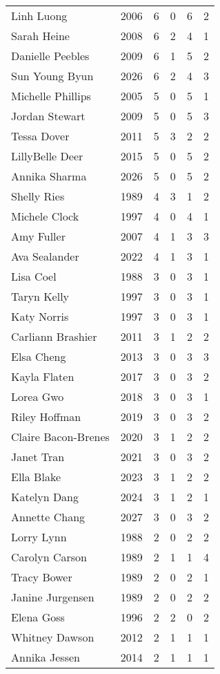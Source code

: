 \begin{longtable}{lccccc}
Linh Luong & 2006 & 6 & 0 & 6 & 2 \\
Sarah Heine & 2008 & 6 & 2 & 4 & 1 \\
Danielle Peebles & 2009 & 6 & 1 & 5 & 2 \\
Sun Young Byun & 2026 & 6 & 2 & 4 & 3 \\
Michelle Phillips & 2005 & 5 & 0 & 5 & 1 \\
Jordan Stewart & 2009 & 5 & 0 & 5 & 3 \\
Tessa Dover & 2011 & 5 & 3 & 2 & 2 \\
LillyBelle Deer & 2015 & 5 & 0 & 5 & 2 \\
Annika Sharma & 2026 & 5 & 0 & 5 & 2 \\
Shelly Ries & 1989 & 4 & 3 & 1 & 2 \\
Michele Clock & 1997 & 4 & 0 & 4 & 1 \\
Amy Fuller & 2007 & 4 & 1 & 3 & 3 \\
Ava Sealander & 2022 & 4 & 1 & 3 & 1 \\
Lisa Coel & 1988 & 3 & 0 & 3 & 1 \\
Taryn Kelly & 1997 & 3 & 0 & 3 & 1 \\
Katy Norris & 1997 & 3 & 0 & 3 & 1 \\
Carliann Brashier & 2011 & 3 & 1 & 2 & 2 \\
Elsa Cheng & 2013 & 3 & 0 & 3 & 3 \\
Kayla Flaten & 2017 & 3 & 0 & 3 & 2 \\
Lorea Gwo & 2018 & 3 & 0 & 3 & 1 \\
Riley Hoffman & 2019 & 3 & 0 & 3 & 2 \\
Claire Bacon-Brenes & 2020 & 3 & 1 & 2 & 2 \\
Janet Tran & 2021 & 3 & 0 & 3 & 2 \\
Ella Blake & 2023 & 3 & 1 & 2 & 2 \\
Katelyn Dang & 2024 & 3 & 1 & 2 & 1 \\
Annette Chang & 2027 & 3 & 0 & 3 & 2 \\
Lorry Lynn & 1988 & 2 & 0 & 2 & 2 \\
Carolyn Carson & 1989 & 2 & 1 & 1 & 4 \\
Tracy Bower & 1989 & 2 & 0 & 2 & 1 \\
Janine Jurgensen & 1989 & 2 & 0 & 2 & 2 \\
Elena Goss & 1996 & 2 & 2 & 0 & 2 \\
Whitney Dawson & 2012 & 2 & 1 & 1 & 1 \\
Annika Jessen & 2014 & 2 & 1 & 1 & 1 \\

\end{longtable}
